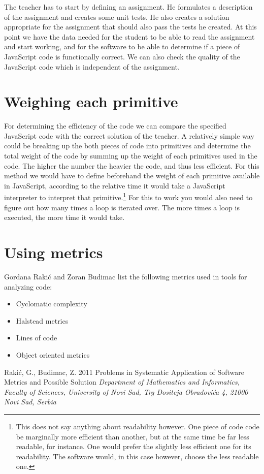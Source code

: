 \documentclass{article}
\begin{document}
The teacher has to start by defining an assignment. He formulates a description
of the assignment and creates some unit tests. He also creates a solution
appropriate for the assignment that should also pass the tests he created. At
this point we have the data needed for the student to be able to read the
assignment and start working, and for the software to be able to determine if a
piece of JavaScript code is functionally correct. We can also check the quality
of the JavaScript code which is independent of the assignment.

\section{Weighing each primitive}

For determining the efficiency of the code we can compare the specified
JavaScript code with the correct solution of the teacher. A relatively simple
way could be breaking up the both pieces of code into primitives and determine
the total weight of the code by summing up the weight of each primitives used
in the code. The higher the number the heavier the code, and thus less
efficient. For this method we would have to define beforehand the weight of
each primitive available in JavaScript, according to the relative time it would
take a JavaScript interpreter to interpret that primitive.\footnote{This does
not say anything about readability however. One piece of code code be
marginally more efficient than another, but at the same time be far less
readable, for instance. One would prefer the slightly less efficient one for
its readability. The software would, in this case however, choose the less
readable one.} For this to work you would also need to figure out how many
times a loop is iterated over. The more times a loop is executed, the more time
it would take.

\section{Using metrics}

Gordana Rakić and Zoran Budimac\cite{rakic11} list the following metrics used
in tools for analyzing code:

\begin{itemize}
  \item Cyclomatic complexity
  \item Halstead metrics
  \item Lines of code
  \item Object oriented metrics
\end{itemize}

\begin{thebibliography}{9}
    Rakić, G., Budimac, Z. 2011
    Problems in Systematic Application of Software Metrics and Possible
    Solution
    {\em Department of Mathematics and Informatics, Faculty of Sciences,
      University of Novi Sad, Trg Dositeja Obradovića 4, 21000 Novi Sad,
      Serbia}
\end{thebibliography}
\end{document}
